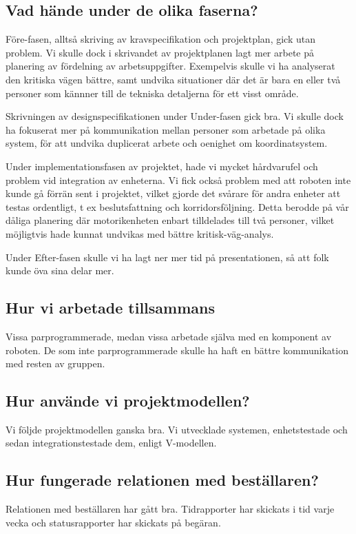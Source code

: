 \documentclass[a4paper,titlepage,12pt]{article}
\begin{document}
	\subsection{Vad hände under de olika faserna?}

    Före-fasen, alltså skriving av kravspecifikation och projektplan, gick utan
    problem. Vi skulle dock i skrivandet av projektplanen lagt mer arbete på
    planering av fördelning av arbetsuppgifter. Exempelvis skulle vi ha
    analyserat den kritiska vägen bättre, samt undvika situationer där det är
    bara en eller två personer som kännner till de tekniska detaljerna för ett
    visst område.

    Skrivningen av designspecifikationen under Under-fasen gick bra. Vi
    skulle dock ha fokuserat mer på kommunikation mellan personer som arbetade på
    olika system, för att undvika duplicerat arbete och oenighet om
    koordinatsystem.

    Under implementationsfasen av projektet, hade vi mycket hårdvarufel och
    problem vid integration av enheterna. Vi fick också problem med att roboten
    inte kunde gå förrän sent i projektet, vilket gjorde det svårare för andra
    enheter att testas ordentligt, t ex beslutsfattning och korridorsföljning.
    Detta berodde på vår dåliga planering där motorikenheten enbart tilldelades
    till två personer, vilket möjligtvis hade kunnat undvikas med bättre
    kritisk-väg-analys.

    Under Efter-fasen skulle vi ha lagt ner mer tid på presentationen, så att
    folk kunde öva sina delar mer.
	
	\subsection{Hur vi arbetade tillsammans}
    Vissa parprogrammerade, medan vissa arbetade själva med en komponent av
    roboten. De som inte parprogrammerade skulle ha haft en bättre
    kommunikation med resten av gruppen.
	
	\subsection{Hur använde vi projektmodellen?}
    Vi följde projektmodellen ganska bra. Vi utvecklade systemen, enhetstestade
    och sedan integrationstestade dem, enligt V-modellen.
	
	\subsection{Hur fungerade relationen med beställaren?}
    Relationen med beställaren har gått bra. Tidrapporter har skickats i tid
    varje vecka och statusrapporter har skickats på begäran. 
	
\end{document}
